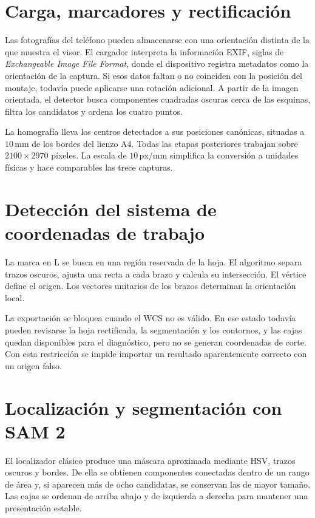 \section{Carga, marcadores y rectificación}

Las fotografías del teléfono pueden almacenarse con una orientación distinta de la que muestra el visor. El cargador interpreta la información EXIF, siglas de \textit{Exchangeable Image File Format}, donde el dispositivo registra metadatos como la orientación de la captura. Si esos datos faltan o no coinciden con la posición del montaje, todavía puede aplicarse una rotación adicional. A partir de la imagen orientada, el detector busca componentes cuadradas oscuras cerca de las esquinas, filtra los candidatos y ordena los cuatro puntos.

La homografía lleva los centros detectados a sus posiciones canónicas, situadas a $10\,\text{mm}$ de los bordes del lienzo A4. Todas las etapas posteriores trabajan sobre $2100 \times 2970$ píxeles. La escala de $10\,\text{px/mm}$ simplifica la conversión a unidades físicas y hace comparables las trece capturas.

\section{Detección del sistema de coordenadas de trabajo}

La marca en L se busca en una región reservada de la hoja. El algoritmo separa trazos oscuros, ajusta una recta a cada brazo y calcula su intersección. El vértice define el origen. Los vectores unitarios de los brazos determinan la orientación local.

La exportación se bloquea cuando el WCS no es válido. En ese estado todavía pueden revisarse la hoja rectificada, la segmentación y los contornos, y las cajas quedan disponibles para el diagnóstico, pero no se generan coordenadas de corte. Con esta restricción se impide importar un resultado aparentemente correcto con un origen falso.

\section{Localización y segmentación con SAM 2}

El localizador clásico produce una máscara aproximada mediante HSV, trazos oscuros y bordes. De ella se obtienen componentes conectadas dentro de un rango de área y, si aparecen más de ocho candidatas, se conservan las de mayor tamaño. Las cajas se ordenan de arriba abajo y de izquierda a derecha para mantener una presentación estable.

